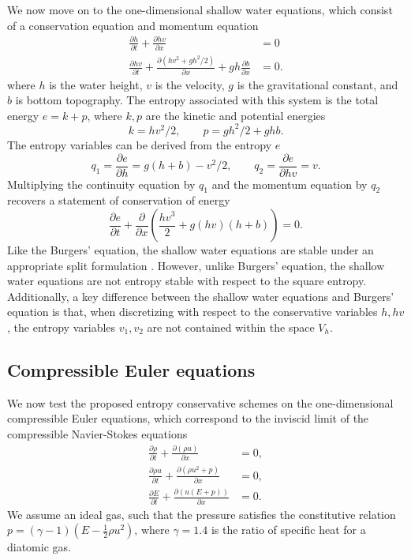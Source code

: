 \documentclass[preprint,10pt]{article}
\theoremstyle{definition}
\theoremstyle{lemma}
\theoremstyle{theorem}
\theoremstyle{assumption}
\newcommand{\pd}[2]{\frac{\partial#1}{\partial#2}}
\newcommand{\LRp}[1]{\left( #1 \right)}
\begin{document}
We now move on to the one-dimensional shallow water equations, which consist of a conservation equation and momentum equation
\begin{align*}
\pd{h}{t} + \pd{hv}{x} &= 0\\
\pd{hv}{t} + \pd{\LRp{hv^2 + gh^2/2}}{x} + gh\pd{b}{x}&= 0.
\end{align*}
where $h$ is the water height, $v$ is the velocity, $g$ is the gravitational constant, and $b$ is bottom topography.  The entropy associated with this system is the total energy $e = k + p$, where $k, p$ are the kinetic and potential energies
\[
k = hv^2/2, \qquad p = gh^2/2 + ghb.
\]
The entropy variables can be derived from the entropy $e$
\[
q_1 = \pd{e}{h} = g(h+b)-v^2/2, \qquad q_2 = \pd{e}{hv} = v.
\]
Multiplying the continuity equation by $q_1$ and the momentum equation by $q_2$ recovers a statement of conservation of energy
\[
\pd{e}{t} + \pd{}{x}\LRp{\frac{hv^3}{2} + g(hv)(h+b)} = 0.  
\]
Like the Burgers' equation, the shallow water equations are stable under an appropriate split formulation \cite{gassner2016well, chen2017entropy}.  However, unlike Burgers' equation, the shallow water equations are not entropy stable with respect to the square entropy.  Additionally, a key difference between the shallow water equations and Burgers' equation is that, when discretizing with respect to the conservative variables $h, hv$, the entropy variables $v_1,v_2$ are not contained within the space $V_h$.  

\subsection{Compressible Euler equations}

We now test the proposed entropy conservative schemes on the one-dimensional compressible Euler equations, which correspond to the inviscid limit of the compressible Navier-Stokes equations
\begin{align*}
\pd{\rho}{t} + \pd{\LRp{\rho u}}{x} &= 0,\\
\pd{\rho u}{t} + \pd{\LRp{\rho u^2 + p }}{x} &= 0,\\
\pd{E}{t} + \pd{\LRp{u(E+p)}}{x} &= 0.
\end{align*}
We assume an ideal gas, such that the pressure satisfies the constitutive relation $p = (\gamma-1)\LRp{E - \frac{1}{2}\rho u^2}$, where $\gamma = 1.4$ is the ratio of specific heat for a diatomic gas.    
\end{document}
